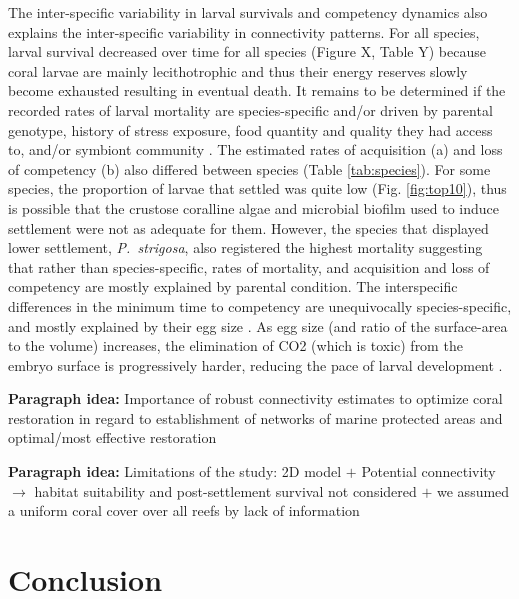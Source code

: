 \documentclass[preprint,12pt,authoryear]{elsarticle}
\begin{document}
The inter-specific variability in larval survivals and competency dynamics also explains the inter-specific variability in connectivity patterns. For all species, larval survival decreased over time for all species (Figure X, Table Y) because coral larvae are mainly lecithotrophic and thus their energy reserves slowly become exhausted resulting in eventual death. It remains to be determined if the recorded rates of larval mortality are species-specific and/or driven by parental genotype, history of stress exposure, food quantity and quality they had access to, and/or symbiont community \citep{jones2011tradeoffs, baums2013genotypic, padilla2013all, kirk2018genomic}. The estimated rates of acquisition (a) and loss of competency (b) also differed between species (Table \ref{tab:species}). For some species, the proportion of larvae that settled was quite low (Fig. \ref{fig:top10}), thus is possible that the crustose coralline algae and microbial biofilm used to induce settlement were not as adequate for them. However, the species that displayed lower settlement, \textit{P.~strigosa}, also registered the highest mortality suggesting that rather than species-specific, rates of mortality, and acquisition and loss of competency are mostly explained by parental condition. The interspecific differences in the minimum time to competency are unequivocally species-specific, and mostly explained by their egg size \citep{figueiredo2013synthesizing}. As egg size (and ratio of the surface-area to the volume) increases, the elimination of CO2 (which is toxic) from the embryo surface is progressively harder, reducing the pace of larval development \citep{berrill1935cell, einum2002egg}.

\textbf{Paragraph idea:} Importance of robust connectivity estimates to optimize coral restoration in regard to establishment of networks of marine protected areas and optimal/most effective restoration

\textbf{Paragraph idea:} Limitations of the study: 2D model $+$ Potential connectivity $\rightarrow$ habitat suitability and post-settlement survival not considered $+$ we assumed a uniform coral cover over all reefs by lack of information


\section*{Conclusion}

\lipsum[1-1]

\end{document}
